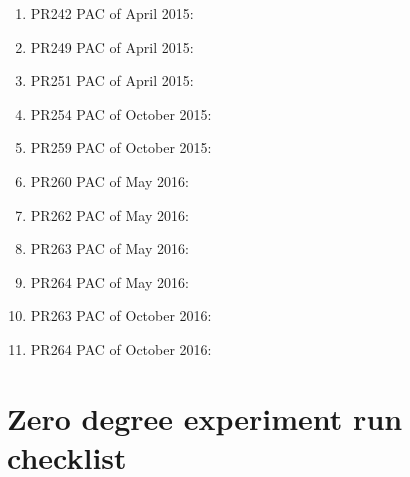 \documentclass[11pt]{report}
\begin{document}
\begin{enumerate}
\item PR242  PAC of April 2015:
\item PR249  PAC of April 2015:
\item PR251  PAC of April 2015:
\item PR254  PAC of October 2015:
\item PR259  PAC of October 2015:
\item PR260  PAC of May 2016:
\item PR262  PAC of May 2016:
\item PR263  PAC of May 2016:
\item PR264  PAC of May 2016:
\item PR263  PAC of October 2016:
\item PR264  PAC of October 2016:




\end{enumerate}




\chapter{Zero degree experiment run checklist}
\end{document}

